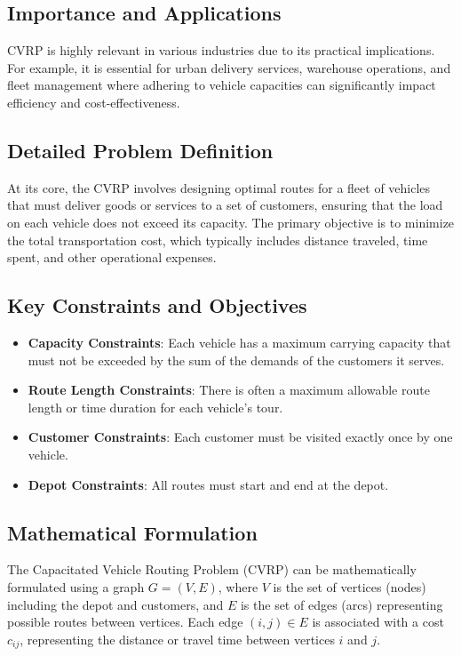 \documentclass[
]{article}
\begin{document}
\subsection{Importance and Applications}

CVRP is highly relevant in various industries due to its practical implications. For example, it is essential for urban delivery services, warehouse operations, and fleet management where adhering to vehicle capacities can significantly impact efficiency and cost-effectiveness.

\subsection{Detailed Problem Definition}

At its core, the CVRP involves designing optimal routes for a fleet of vehicles that must deliver goods or services to a set of customers, ensuring that the load on each vehicle does not exceed its capacity. The primary objective is to minimize the total transportation cost, which typically includes distance traveled, time spent, and other operational expenses.

\subsection{Key Constraints and Objectives}

\begin{itemize}
    \item \textbf{Capacity Constraints}: Each vehicle has a maximum carrying capacity that must not be exceeded by the sum of the demands of the customers it serves.
    \item \textbf{Route Length Constraints}: There is often a maximum allowable route length or time duration for each vehicle’s tour.
    \item \textbf{Customer Constraints}: Each customer must be visited exactly once by one vehicle.
    \item \textbf{Depot Constraints}: All routes must start and end at the depot.
\end{itemize}

\subsection{Mathematical Formulation}

The Capacitated Vehicle Routing Problem (CVRP) can be mathematically formulated using a graph $G = (V, E)$, where $V$ is the set of vertices (nodes) including the depot and customers, and $E$ is the set of edges (arcs) representing possible routes between vertices. Each edge $(i, j) \in E$ is associated with a cost $c_{ij}$, representing the distance or travel time between vertices $i$ and $j$.
\end{document}
